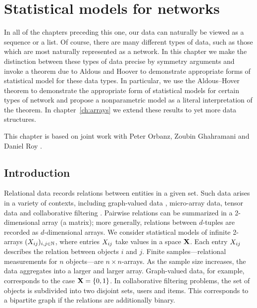 
\inbpdocument

\chapter{Statistical models for networks}
\label{ch:networks}

In all of the chapters preceding this one, our data can naturally be viewed as a sequence or a list.
Of course, there are many different types of data, such as those which are most naturally represented as a network.
In this chapter we make the distinction between these types of data precise by symmetry arguments and invoke a theorem due to Aldous and Hoover to demonstrate appropriate forms of statistical model for these data types.
In particular, we use the Aldous--Hover theorem to demonstrate the appropriate form of statistical models for certain types of network and propose a nonparametric model as a literal interpretation of the theorem.
In chapter~\ref{ch:arrays} we extend these results to yet more data structures.

This chapter is based on joint work with Peter Orbanz, Zoubin Ghahramani and Daniel Roy .

\section{Introduction}

Relational data records relations between entities in a given set. Such data
arises in a variety of contexts, including graph-valued data 
\citep[e.g.][]{Airoldi2008,Hoff2002}, micro-array data, tensor data 
\citep[e.g.][]{Xu:Yan:Qi:2012} and collaborative filtering
\citep[e.g.][]{Salakhutdinov2008}.
Pairwise relations can be summarized in a 2-dimensional array (a matrix);
more generally, relations between $d$-tuples are recorded as $d$-dimensional arrays.
We consider statistical models of infinite 2-arrays $(X_{ij})_{i,j\in\mathbb{N}}$, where entries $X_{ij}$ take values in a space $\mathbf{X}$. 
Each entry $X_{ij}$ describes the relation between objects $i$ and $j$. Finite
samples---relational measurements for $n$ objects---are $n\times n$-arrays. As the sample size increases, the data aggregates into
a larger and larger array. 
Graph-valued data, for example, corresponds to the case $\mathbf{X}=\lbrace{0,1}\rbrace$.
In collaborative filtering problems, the set of objects
is subdivided into two disjoint sets, \eg users and items. This corresponds to a bipartite graph if the relations are additionally binary.

